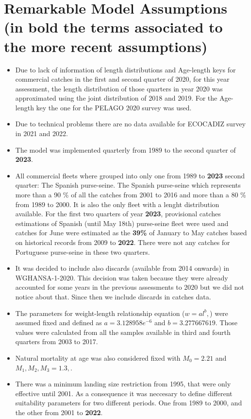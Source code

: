 \documentclass[review]{elsarticle}
\begin{document}
\section{Remarkable Model Assumptions (in bold the terms associated to the more recent assumptions)}\label{Remark}
\begin{itemize}
\item Due to lack of information of length distributions and Age-length keys for commercial catches in the first and second quarter of 2020, for this year assessment, the length distribution of those quarters in year 2020 was approximated using the joint distribution of 2018 and 2019. For the Age-length key the one for the PELAGO 2020 survey was used.
\item Due to technical problems there are no data available for ECOCADIZ survey in 2021 and 2022.
\item The model was implemented quarterly from 1989 to the second quarter of \textbf{2023}. 
\item All commercial fleets where grouped into only one from 1989 to \textbf{2023} second quarter: The Spanish purse-seine. The Spanish purse-seine which represents more than a 90 \% of all the catches from 2001 to 2016 and more than a 80 \% from 1989 to 2000. It is also the only fleet with a lenght distribution available. For the first two quarters of year \textbf{2023}, provisional catches estimations of Spanish (until May 18th) purse-seine fleet were used and catches for June were estimated as the \textbf{39\%} of January to May catches based on historical records from 2009 to \textbf{2022}. There were not any catches for Portuguese purse-seine in these two quarters. 
\item It was decided to include also discards (available from 2014 onwards) in WGHANSA-1-2020. This decision was taken because they were already accounted for some years in the previous assessments to 2020 but we did not notice about that. Since then we include discards in catches data.
\item The parameters for weight-length relationship equation ($w=al^b,$) were assumed fixed and defined as $a=3.128958e^{-6}$ and  $b=3.277667619.$  Those values were calculated from all the samples available in third and fourth quarters from 2003 to 2017.
\item Natural mortality at age was also considered fixed with $M_{0}=2.21$ and $M_{1},M_{2},M_{3}=1.3,$.  
\item There was a minimum landing size restriction from 1995, that were only effective until 2001. As a consequence it was neccesary to define different suitability parameters for two different periods. One from 1989 to 2000, and the other from 2001 to \textbf{2022}.

\end{itemize}
\end{document}
